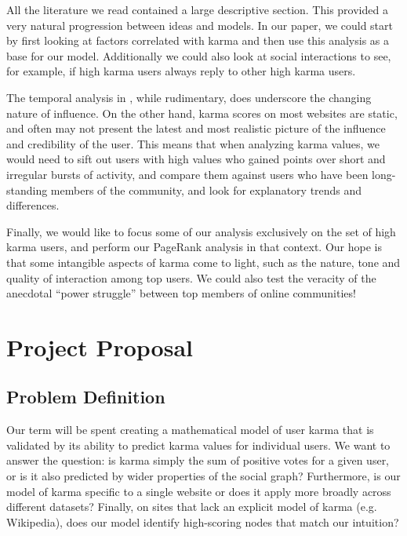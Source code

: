 \documentclass[10pt]{article}
\begin{document}
All the literature we read contained a large descriptive section. This provided
a very natural progression between ideas and models. In our paper, we could
start by first looking at factors correlated with karma and then use this
analysis as a base for our model. Additionally we could also look at social
interactions to see, for example, if high karma users always reply to other high
karma users.

The temporal analysis in \citet{cha2010measuring}, while rudimentary, does
underscore the changing nature of influence. On the other hand, karma scores on
most websites are static, and often may not present the latest and most
realistic picture of the influence and credibility of the user. This means that
when analyzing karma values, we would need to sift out users with high values
who gained points over short and irregular bursts of activity, and compare them
against users who have been long-standing members of the community, and look for
explanatory trends and differences.

Finally, we would like to focus some of our analysis exclusively on the set of
high karma users, and perform our PageRank analysis in that context. Our hope is
that some intangible aspects of karma come to light, such as the nature, tone
and quality of interaction among top users. We could also test the veracity of
the anecdotal ``power struggle'' between top members of online communities!

\section{Project Proposal} \subsection{Problem Definition}
Our term will be spent creating a mathematical model of user karma that is
validated by its ability to predict karma values for individual users. We want
to answer the question: is karma simply the sum of positive votes for a given
user, or is it also predicted by wider properties of the social graph?
Furthermore, is our model of karma specific to a single website or does it apply
more broadly across different datasets?  Finally, on sites that lack an explicit
model of karma (e.g. Wikipedia), does our model identify high-scoring nodes that
match our intuition?
\end{document}
